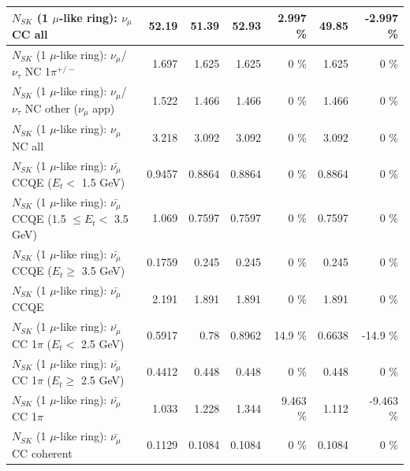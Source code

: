 \begin{table}
\begin{tabular}{| l | r | r | r  r | r  r |}
                                $N_{SK}$ (1 $\mu$-like ring): $\nu_{\mu}$ CC all &           52.19 &           51.39 &           52.93 &    2.997 \%  &           49.85 &   -2.997 \%  \\ 
\hline
              $N_{SK}$ (1 $\mu$-like ring): $\nu_\mu$/$\nu_\tau$ NC 1$\pi^{+/-}$ &           1.697 &           1.625 &           1.625 &        0 \%  &           1.625 &        0 \%  \\ 
     $N_{SK}$ (1 $\mu$-like ring): $\nu_\mu$/$\nu_\tau$ NC other ($\nu_\mu$ app) &           1.522 &           1.466 &           1.466 &        0 \%  &           1.466 &        0 \%  \\ 
                                $N_{SK}$ (1 $\mu$-like ring): $\nu_{\mu}$ NC all &           3.218 &           3.092 &           3.092 &        0 \%  &           3.092 &        0 \%  \\ 
\hline
\hline
\hline
          $N_{SK}$ (1 $\mu$-like ring): $\bar{\nu_\mu}$ CCQE ($E_{t} <$ 1.5 GeV) &          0.9457 &          0.8864 &          0.8864 &        0 \%  &          0.8864 &        0 \%  \\ 
 $N_{SK}$ (1 $\mu$-like ring): $\bar{\nu_\mu}$ CCQE (1.5 $\leq E_{t} <$ 3.5 GeV) &           1.069 &          0.7597 &          0.7597 &        0 \%  &          0.7597 &        0 \%  \\ 
       $N_{SK}$ (1 $\mu$-like ring): $\bar{\nu_\mu}$ CCQE ($E_{t} \geq$ 3.5 GeV) &          0.1759 &           0.245 &           0.245 &        0 \%  &           0.245 &        0 \%  \\ 
\hline
                              $N_{SK}$ (1 $\mu$-like ring): $\bar{\nu_\mu}$ CCQE &           2.191 &           1.891 &           1.891 &        0 \%  &           1.891 &        0 \%  \\ 
\hline
     $N_{SK}$ (1 $\mu$-like ring): $\bar{\nu_\mu}$ CC 1$\pi$ ($E_{t} <$ 2.5 GeV) &          0.5917 &            0.78 &          0.8962 &     14.9 \%  &          0.6638 &    -14.9 \%  \\ 
  $N_{SK}$ (1 $\mu$-like ring): $\bar{\nu_\mu}$ CC 1$\pi$ ($E_{t} \geq$ 2.5 GeV) &          0.4412 &           0.448 &           0.448 &        0 \%  &           0.448 &        0 \%  \\ 
\hline
                         $N_{SK}$ (1 $\mu$-like ring): $\bar{\nu_\mu}$ CC 1$\pi$ &           1.033 &           1.228 &           1.344 &    9.463 \%  &           1.112 &   -9.463 \%  \\ 
                       $N_{SK}$ (1 $\mu$-like ring): $\bar{\nu_\mu}$ CC coherent &          0.1129 &          0.1084 &          0.1084 &        0 \%  &          0.1084 &        0 \%  \\ 

\end{tabular}
\end{table}
